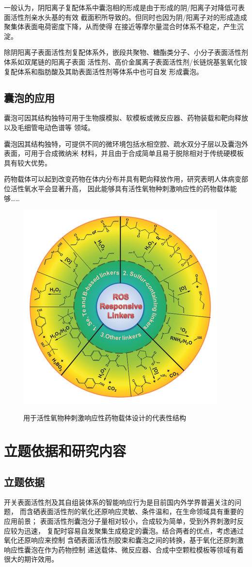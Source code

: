\documentclass[bachelor,fandolfonts,replaceperiod]{jnuthesis}
\begin{document}
    一般认为，阴阳离子复配体系中囊泡相的形成是由于形成的阴/阳离子对降低可表面活性剂亲水头基的有效
    截面积所导致的\cite{刘洪国2016}。但同时也因为阴/阳离子对的形成造成聚集体表面电荷密度下降，从而使得
    在接近等摩尔量混合时体系不稳定，产生沉淀。
    
    除阴阳离子表面活性剂复配体系外，嵌段共聚物、糖酯类分子、小分子表面活性剂体系如双尾链的阳离子表面
    活性剂、高价金属离子表面活性剂/长链烷基氢氧化铵复配体系和脂肪酸及其助表面活性剂等体系中也可自发
    形成囊泡\cite{刘洪国2016}。
        
    \subsection{囊泡的应用}
    囊泡可因其结构独特可用于生物膜模拟、软模板或微反应器、药物装载和靶向释放以及毛细管电动色谱等
    领域\cite{蒋玲玲2018}。
    
    囊泡因其结构独特，可提供不同的微环境包括水相空腔、疏水双分子层以及囊泡外表面，可用于合成微纳米
    材料，并且由于合成简单且易于脱除相对于传统硬模板具有较大优势。
    
    药物载体可以起到改变药物在体内分布并具有靶向释放作用，研究表明人体病变部位活性氧水平会显著升高，
    因此能够具有活性氧物种刺激响应性的药物载体能够……    
    \begin{figure}[htbp]
        \centering
        \includegraphics[width= .426\textwidth]{figure/vesicle-ros.png}\\
        \caption{用于活性氧物种刺激响应性药物载体设计的代表性结构\cite{saravanakumar2017}}
        \label{fig:vesicle-ros}
    \end{figure}
    
    \section{立题依据和研究内容}
    \subsection{立题依据}
    开关表面活性剂及其自组装体系的智能响应行为是目前国内外学界普遍关注的问题，
    而含硒表面活性剂的氧化还原响应灵敏、条件温和，在生命领域具有重要的应用前景；
    表面活性剂囊泡分子量相对较小，合成较为简单，受到外界刺激时反应较为迅速，
    复配时容易自发聚集生成稳定的囊泡。结合两者的优点，考虑通过氧化还原响应来控制
    含硒表面活性剂胶束和囊泡之间的转换，基于氧化还原刺激响应性囊泡在作为药物控制
    递送载体、微反应器、合成中空颗粒模板等领域有着很大的期许效用。
    
\end{document}
